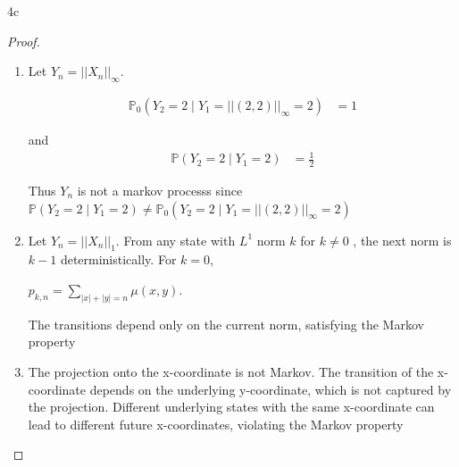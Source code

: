 \documentclass{article}
\newcommand{\PR}{\mathbb{P}}
\newcommand{\abs}[1]{\left\lvert #1\right\rvert}
\begin{document}
\begin{PROB}{4c}\label{Problem 4c.}
\end{PROB}
\begin{proof}
    \begin{enumerate}
        \item Let $Y_n = \abs{\abs{X_n}}_\infty$.
        
        \begin{align*}
            \PR_0(Y_2 = 2 \mid Y_1 = \abs{\abs{(2, 2)}}_{\infty} = 2) &= 1
        \end{align*}

        and \begin{align*}
            \PR(Y_2 = 2 \mid Y_1 = 2) &= \frac{1}{2}
        \end{align*}

        Thus $Y_n$ is not a markov processs since $\PR(Y_2 = 2 \mid Y_1 = 2) \neq \PR_0(Y_2 = 2 \mid Y_1 = \abs{\abs{(2, 2)}}_{\infty} = 2)$  

        \item Let $Y_n = \abs{\abs{X_n}}_{1}$. From any state with $L^1$ norm $k$ for $k \neq 0$ , the next norm is $k - 1$ deterministically. For $k = 0$, 
        
        $p_{k, n} = \sum_{\abs{x } + \abs{y} = n} \mu(x, y)$. 
        

        The transitions depend only on the current norm, satisfying the Markov property

        \item The projection onto the x-coordinate is not Markov. The transition of the x-coordinate depends on the underlying y-coordinate, which is not captured by the projection. Different underlying states with the same x-coordinate can lead to different future x-coordinates, violating the Markov property
    \end{enumerate}
    
\end{proof}
\end{document}
